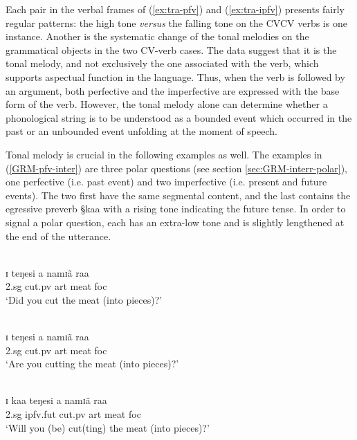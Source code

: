 Each pair in the verbal frames of  (\ref{ex:tra-pfv}) and (\ref{ex:tra-ipfv})
presents fairly regular patterns:  the high tone {\it versus} the falling tone
on the CVCV verbs is one instance. Another is the systematic change of the tonal
melodies on the grammatical objects in the two CV-verb cases. The data suggest
that
it is the tonal melody, and not exclusively the one associated with the verb,
which supports aspectual function in the language.
Thus, when the verb is followed by an argument, both perfective and the
imperfective are expressed with the base form of the verb.  However,  the tonal
melody alone  can determine whether a phonological string is to be understood as
a bounded event which occurred in the past or an unbounded event unfolding at
the moment of speech.



Tonal melody is crucial in the following examples as well. The examples in
(\ref{GRM-pfv-inter}) are three polar questions (see section
\ref{sec:GRM-interr-polar}), one perfective (i.e. past event) and two
imperfective (i.e. present and future events). The two first have the
same segmental content, and the last contains the egressive preverb {\S kaa}
with a rising tone indicating the future tense.  In order to signal a polar
question, each has  an extra-low tone and is slightly lengthened at the end of
the utterance. 

\begin{exe}
\ex\label{GRM-pfv-inter}
\begin{xlist}

\ex\label{GRM-pfv-inter-pfv}
 {\T   } {\T  } {\T  } {\T }\\
 ɪ   teŋesi  a  namɪã  raa \\
          {\sc 2.sg} {cut.{\sc pv}} {\sc art} {meat} {\sc foc}\\
\glt `Did you cut the meat (into pieces)?'\\



\ex\label{GRM-pfv-inter-impf}

 {\T   } {\T  } {\T  } {\T }\\
ɪ   teŋesi  a  namɪã  raa \\
          {\sc 2.sg} {cut.{\sc pv}} {\sc art} {meat} {\sc foc}\\
\glt `Are you cutting the meat (into pieces)?'\\


\ex\label{GRM-pfv-inter-impf-fut}

 {\T  } {\T   } {\T  } {\T  } {\T }\\
ɪ  kaa teŋesi  a  namɪã  raa \\
          {\sc 2.sg} {\sc ipfv.fut} {cut.{\sc pv}} {\sc art} {meat} {\sc foc}\\
\glt  `Will you (be) cut(ting) the meat (into pieces)?'\\

 \end{xlist}
\end{exe}

